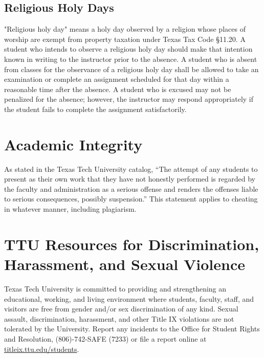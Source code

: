 \documentclass[12pt, notitlepage]{article}   	%
\begin{document}
\subsection{Religious Holy Days}
"Religious holy day" means a holy day observed by a religion whose places of worship are 
exempt from property taxation under Texas Tax Code §11.20.
A student who intends to observe a religious holy day should make that intention known 
in writing to the instructor prior to the absence. A student who is absent from classes 
for the observance of a religious holy day shall be allowed to take an examination or 
complete an assignment scheduled for that day within a reasonable time after the absence.
A student who is excused may not be penalized for the absence; however, the instructor 
may respond appropriately if the student fails to complete the assignment satisfactorily.

\section{Academic Integrity}
As stated in the Texas Tech University catalog, “The attempt of any students to present 
as their own work that they have not honestly performed is regarded by the faculty and 
administration as a serious offense and renders the offenses liable to serious 
consequences, possibly suspension.” This statement applies to cheating in whatever 
manner, including plagiarism.

\section{TTU Resources for Discrimination, Harassment, and Sexual Violence}
Texas Tech University is committed to providing and strengthening an educational, 
working, and living environment where students, faculty, staff, and visitors are 
free from gender and/or sex discrimination of any kind. Sexual assault, discrimination, 
harassment, and other Title IX violations are not tolerated by the University. 
Report any incidents to the Office for Student Rights and Resolution, 
(806)-742-SAFE (7233) or file a report online at 
\url{titleix.ttu.edu/students}. 
\end{document}
